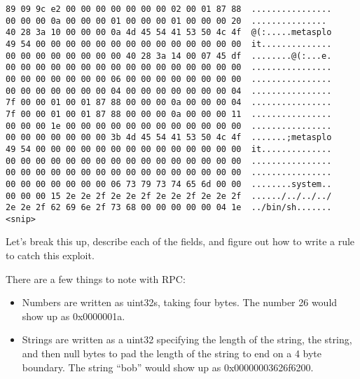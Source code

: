 \documentclass[english]{report}
\begin{document}
\begin{verbatim}
89 09 9c e2 00 00 00 00 00 00 00 02 00 01 87 88  ................
00 00 00 0a 00 00 00 01 00 00 00 01 00 00 00 20  ...............
40 28 3a 10 00 00 00 0a 4d 45 54 41 53 50 4c 4f  @(:.....metasplo
49 54 00 00 00 00 00 00 00 00 00 00 00 00 00 00  it..............
00 00 00 00 00 00 00 00 40 28 3a 14 00 07 45 df  ........@(:...e.
00 00 00 00 00 00 00 00 00 00 00 00 00 00 00 00  ................
00 00 00 00 00 00 00 06 00 00 00 00 00 00 00 00  ................
00 00 00 00 00 00 00 04 00 00 00 00 00 00 00 04  ................
7f 00 00 01 00 01 87 88 00 00 00 0a 00 00 00 04  ................
7f 00 00 01 00 01 87 88 00 00 00 0a 00 00 00 11  ................
00 00 00 1e 00 00 00 00 00 00 00 00 00 00 00 00  ................
00 00 00 00 00 00 00 3b 4d 45 54 41 53 50 4c 4f  .......;metasplo
49 54 00 00 00 00 00 00 00 00 00 00 00 00 00 00  it..............
00 00 00 00 00 00 00 00 00 00 00 00 00 00 00 00  ................
00 00 00 00 00 00 00 00 00 00 00 00 00 00 00 00  ................
00 00 00 00 00 00 00 06 73 79 73 74 65 6d 00 00  ........system..
00 00 00 15 2e 2e 2f 2e 2e 2f 2e 2e 2f 2e 2e 2f  ....../../../../
2e 2e 2f 62 69 6e 2f 73 68 00 00 00 00 00 04 1e  ../bin/sh.......
<snip>
\end{verbatim}

Let's break this up, describe each of the fields, and figure out how to write a
rule to catch this exploit.  

There are a few things to note with RPC:

\begin{itemize}

\item Numbers are written as uint32s, taking four bytes.  The number 26 would
show up as 0x0000001a.

\item Strings are written as a uint32 specifying the length of the string, the
string, and then null bytes to pad the length of the string to end on a 4 byte
boundary.  The string ``bob'' would show up as 0x00000003626f6200.

\end{itemize}
\end{document}
